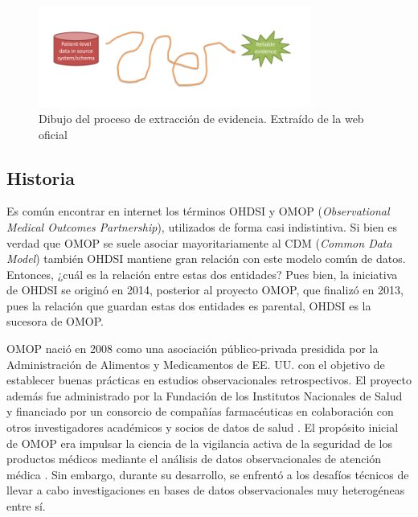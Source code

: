 \begin{enumerate}[label=\roman*.]
\begin{figure}[H]
    \centering
    \includegraphics[width=0.80\textwidth]{figures/drawinJourney.png}
     \caption{Dibujo del proceso de extracción de evidencia. Extraído de la web oficial \cite{OHDSIwebsite}}
    \label{fig:drawinJourney}
\end{figure}



\end{enumerate}

\subsection{Historia}

Es común encontrar en internet los términos OHDSI y OMOP (\textit{Observational Medical Outcomes Partnership}), utilizados de forma casi indistintiva. Si bien es verdad que OMOP se suele asociar mayoritariamente al CDM (\textit{Common Data Model}) también OHDSI mantiene gran relación con este modelo común de datos. Entonces, ¿cuál es la relación entre estas dos entidades? Pues bien, la iniciativa de OHDSI se originó en 2014, posterior al proyecto OMOP, que finalizó en 2013, pues la relación que guardan estas dos entidades es parental, OHDSI es la sucesora de OMOP. 

OMOP nació en 2008 como una asociación público-privada presidida por la Administración de Alimentos y Medicamentos de EE. UU. con el objetivo de establecer buenas prácticas en estudios observacionales retrospectivos. El proyecto además fue administrado por la Fundación de los Institutos Nacionales de Salud y financiado por un consorcio de compañías farmacéuticas en colaboración con otros investigadores académicos y socios de datos de salud \cite{stang2010advancing}. El propósito inicial de OMOP era impulsar la ciencia de la vigilancia activa de la seguridad de los productos médicos mediante el análisis de datos observacionales de atención médica \cite{stang2010advancing}. Sin embargo, durante su desarrollo, se enfrentó a los desafíos técnicos de llevar a cabo investigaciones en bases de datos observacionales muy heterogéneas entre sí.


